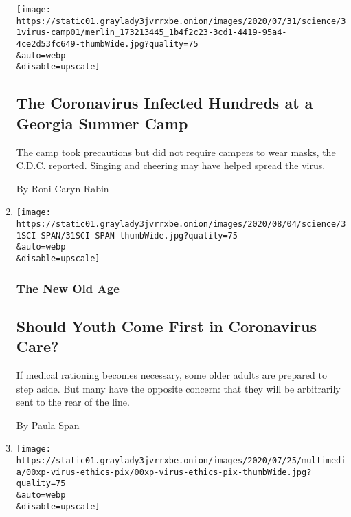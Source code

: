 \begin{enumerate}
  \texttt{[image: https://static01.graylady3jvrrxbe.onion/images/2020/07/31/science/31virus-camp01/merlin\_173213445\_1b4f2c23-3cd1-4419-95a4-4ce2d53fc649-thumbWide.jpg?quality=75\\\&auto=webp\\\&disable=upscale]}

  \hypertarget{the-coronavirus-infected-hundreds-at-a-georgia-summer-camp}{%
  \subsection{The Coronavirus Infected Hundreds at a Georgia Summer
  Camp}\label{the-coronavirus-infected-hundreds-at-a-georgia-summer-camp}}

  The camp took precautions but did not require campers to wear masks,
  the C.D.C. reported. Singing and cheering may have helped spread the
  virus.

  By Roni Caryn Rabin
\item
  \href{/2020/07/31/health/coronavirus-ethics-rationing-elderly.html}{}

  \texttt{[image: https://static01.graylady3jvrrxbe.onion/images/2020/08/04/science/31SCI-SPAN/31SCI-SPAN-thumbWide.jpg?quality=75\\\&auto=webp\\\&disable=upscale]}

  \hypertarget{the-new-old-age}{%
  \subsubsection{The New Old Age}\label{the-new-old-age}}

  \hypertarget{should-youth-come-first-in-coronavirus-care}{%
  \subsection{Should Youth Come First in Coronavirus
  Care?}\label{should-youth-come-first-in-coronavirus-care}}

  If medical rationing becomes necessary, some older adults are prepared
  to step aside. But many have the opposite concern: that they will be
  arbitrarily sent to the rear of the line.

  By Paula Span
\item
  \href{/2020/07/31/health/coronavirus-covid-testing.html}{}

  \texttt{[image: https://static01.graylady3jvrrxbe.onion/images/2020/07/25/multimedia/00xp-virus-ethics-pix/00xp-virus-ethics-pix-thumbWide.jpg?quality=75\\\&auto=webp\\\&disable=upscale]}

  \hypertarget{covid-19-tests-are-in-short-supply-should-you-still-get-one}{%
}
\end{enumerate}
